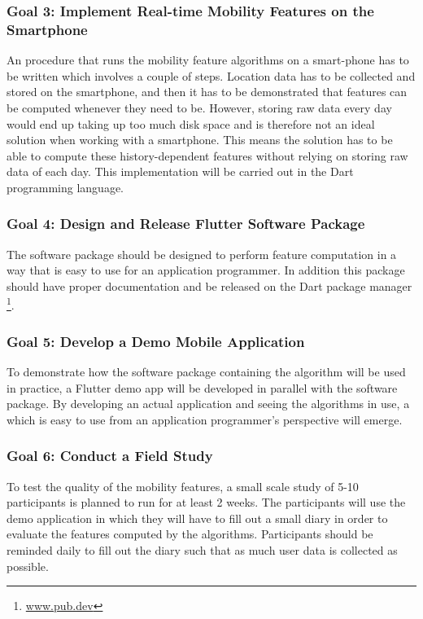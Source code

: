\subsubsection*{Goal 3: Implement Real-time Mobility Features on the Smartphone}
An procedure that runs the mobility feature algorithms on a smart-phone has to be written which involves a couple of steps. Location data has to be collected and stored on the smartphone, and then it has to be demonstrated that features can be computed whenever they need to be. However, storing raw data every day would end up taking up too much disk space and is therefore not an ideal solution when working with a smartphone. This means the solution has to be able to compute these history-dependent features without relying on storing raw data of each day. This implementation will be carried out in the Dart programming language.

\subsubsection*{Goal 4: Design and Release Flutter Software Package}
The software package should be designed to perform feature computation in a way that is easy to use for an application programmer. In addition this package should have proper documentation and be released on the Dart package manager \footnote{\url{www.pub.dev}}.

\subsubsection*{Goal 5: Develop a Demo Mobile Application}
To demonstrate how the software package containing the algorithm will be used in practice, a Flutter demo app will be developed in parallel with the software package. By developing an actual application and seeing the algorithms in use, a which is easy to use from an application programmer's perspective will emerge.

\subsubsection*{Goal 6: Conduct a Field Study}
To test the quality of the mobility features, a small scale study of 5-10 participants is planned to run for at least 2 weeks. The participants will use the demo application in which they will have to fill out a small diary in order to evaluate the features computed by the algorithms. Participants should be reminded daily to fill out the diary such that as much user data is collected as possible.

